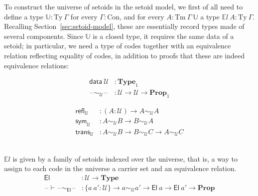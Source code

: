 \documentclass[autoref]{llncs}
\newcommand{\GG}{\Gamma}
\newcommand{\setoidU}{\mathcal{U}}
\newcommand{\mType}{\mathbf{Type}}
\newcommand{\mProp}{\mathbf{Prop}}
\newcommand{\Con}{\mathrm{Con}}
\newcommand{\Ty}{\mathrm{Ty}}
\newcommand{\Tm}{\mathrm{Tm}}
\newcommand{\El}{\textsf{El}}
\newcommand{\Uty}{\mathds{U}}
\newcommand{\EL}{\mathds{E}l}
\newcommand{\equ}[2]{#1 \sim_\setoidU #2}
\newcommand{\blank}{\mathord{\hspace{1pt}\text{--}\hspace{1pt}}}
\begin{document}
To construct the universe of setoids in the setoid model, we first of all need
to define a type $\Uty : \Ty\ \GG$ for every $\GG : \Con$, and for every $A :
\Tm\ \GG\ \Uty$ a type $\mathds{E}l\ A : \Ty\ \GG$. Recalling
Section~\ref{sec:setoid-model}, these are essentially record types made of several
components. Since $\Uty$ is a closed type, it requires the same data of a
setoid; in particular, we need a type of codes together with an equivalence
relation reflecting equality of codes, in addition to proofs that these are
indeed equivalence relations: \\
\begin{minipage}{0.5\textwidth}
\vspace{-0.2em}
\begin{align*}
  \textsf{data} \ \setoidU &: \mType_1 \\
  \blank\sim_\setoidU\blank &: \setoidU \to \setoidU \to \mProp_1
\end{align*}
\end{minipage}
\begin{minipage}{0.5\textwidth}
\vspace{-0.2em}
\begin{align*}
  \textsf{refl}_\setoidU &: (A : \setoidU) \to \equ{A}{A} \\
  \textsf{sym}_\setoidU &: \equ{A}{B} \to \equ{B}{A} \\
  \textsf{trans}_\setoidU &: \equ{A}{B} \to \equ{B}{C} \to \equ{A}{C}
\end{align*}
\end{minipage}
\\

$\EL$ is given by a family of setoids indexed over the universe, that is, a way
to assign to each code in the universe a carrier set and an equivalence
relation.
\vspace{-0.2em}
\begin{align*}
  \El &: \setoidU \to \mType \\
  \blank\vdash\blank\sim_\El\blank &: \{a\ a' : \setoidU\} \to a \sim_\setoidU a' \to \El\ a \to \El\ a' \to \mProp
\end{align*}
\end{document}
